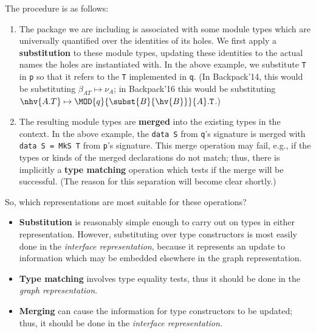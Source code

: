 \noindent
The procedure is as follows:

\begin{enumerate}
    \item The package we are including is associated with some module types
    which are universally quantified over the identities of its holes.
    We first apply a \textbf{substitution} to these module types, updating these
    identities to the actual names the holes are instantiated with.
    In the above example, we substitute \verb|T| in \verb|p| so
    that it refers to the \verb|T| implemented in \verb|q|.  (In Backpack'14,
    this would be substituting $\beta_{AT} \mapsto \nu_A$; in
    Backpack'16 this would be substituting $\nhv{A.T} \mapsto \MOD{q}{\subst{B}{\hv{B}}}{A}.\mathtt{T}$.)

    \item The resulting module types are \textbf{merged}
    into the existing types in the context.  In the above example, the \verb|data S|
    from \verb|q|'s signature is merged with \verb|data S = MkS T| from
    \verb|p|'s signature.  This merge operation may fail, e.g., if
    the types or kinds of the merged declarations do not match; thus,
    there is implicitly a \textbf{type matching} operation which tests
    if the merge will be successful.  (The reason for this separation
    will become clear shortly.)
\end{enumerate}

\noindent
So, which representations are most suitable for these operations?

\begin{itemize}
    \item \textbf{Substitution} is reasonably simple enough to carry out
        on types in either representation.  However, substituting over
        type constructors is most easily done in the \emph{interface
        representation}, because it represents an update to information
        which may be embedded elsewhere in the graph representation.

    \item \textbf{Type matching} involves type equality tests, thus
        it should be done in the \emph{graph representation}.

    \item \textbf{Merging} can cause the information for
        type constructors to be updated; thus, it should be done in the
        \emph{interface representation}.
\end{itemize}

